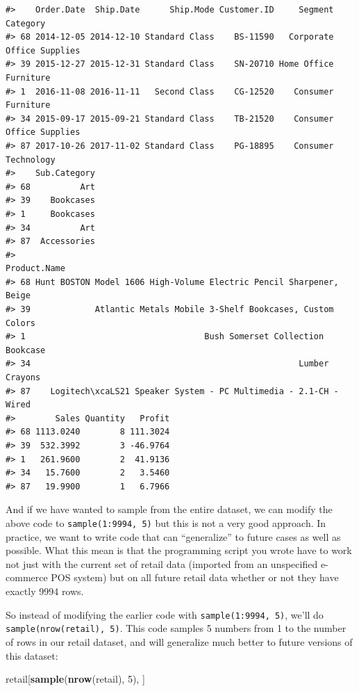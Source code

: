\documentclass[]{article}
\newenvironment{Shaded}{\begin{snugshade}}{\end{snugshade}}
\newcommand{\DecValTok}[1]{\textcolor[rgb]{0.00,0.00,0.81}{#1}}
\newcommand{\KeywordTok}[1]{\textcolor[rgb]{0.13,0.29,0.53}{\textbf{#1}}}
\newcommand{\NormalTok}[1]{#1}
\begin{document}
\begin{verbatim}
#>    Order.Date  Ship.Date      Ship.Mode Customer.ID     Segment        Category
#> 68 2014-12-05 2014-12-10 Standard Class    BS-11590   Corporate Office Supplies
#> 39 2015-12-27 2015-12-31 Standard Class    SN-20710 Home Office       Furniture
#> 1  2016-11-08 2016-11-11   Second Class    CG-12520    Consumer       Furniture
#> 34 2015-09-17 2015-09-21 Standard Class    TB-21520    Consumer Office Supplies
#> 87 2017-10-26 2017-11-02 Standard Class    PG-18895    Consumer      Technology
#>    Sub.Category
#> 68          Art
#> 39    Bookcases
#> 1     Bookcases
#> 34          Art
#> 87  Accessories
#>                                                           Product.Name
#> 68 Hunt BOSTON Model 1606 High-Volume Electric Pencil Sharpener, Beige
#> 39             Atlantic Metals Mobile 3-Shelf Bookcases, Custom Colors
#> 1                                    Bush Somerset Collection Bookcase
#> 34                                                      Lumber Crayons
#> 87    Logitech\xcaLS21 Speaker System - PC Multimedia - 2.1-CH - Wired
#>        Sales Quantity   Profit
#> 68 1113.0240        8 111.3024
#> 39  532.3992        3 -46.9764
#> 1   261.9600        2  41.9136
#> 34   15.7600        2   3.5460
#> 87   19.9900        1   6.7966
\end{verbatim}

And if we have wanted to sample from the entire dataset, we can modify
the above code to \texttt{sample(1:9994,\ 5)} but this is not a very
good approach. In practice, we want to write code that can
``generalize'' to future cases as well as possible. What this mean is
that the programming script you wrote have to work not just with the
current set of retail data (imported from an unspecified e-commerce POS
system) but on all future retail data whether or not they have exactly
9994 rows.

So instead of modifying the earlier code with
\texttt{sample(1:9994,\ 5)}, we'll do \texttt{sample(nrow(retail),\ 5)}.
This code samples 5 numbers from 1 to the number of rows in our retail
dataset, and will generalize much better to future versions of this
dataset:

\begin{Shaded}
\begin{Highlighting}[]
\NormalTok{retail[}\KeywordTok{sample}\NormalTok{(}\KeywordTok{nrow}\NormalTok{(retail), }\DecValTok{5}\NormalTok{), ]}
\end{Highlighting}
\end{Shaded}
\end{document}
